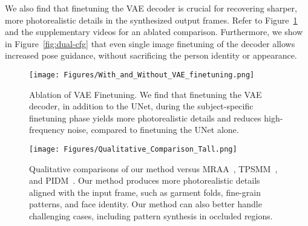         We also find that finetuning the VAE decoder is crucial for recovering sharper, more photorealistic details in the synthesized output frames. %
        Refer to Figure~\ref{fig:vae-finetuning} and the supplementary videos for an ablated comparison. Furthermore, we show in Figure~\ref{fig:dual-cfg} that even single image finetuning of the decoder allows increased pose guidance, without sacrificing the person identity or appearance.

        \begin{figure}[h!]
            \begin{center}
                \texttt{[image: Figures/With\_and\_Without\_VAE\_finetuning.png]}
            \end{center}
           \caption{Ablation of VAE Finetuning. We find that finetuning the VAE decoder, in addition to the UNet, during the subject-specific finetuning phase yields more photorealistic details and reduces high-frequency noise, compared to finetuning the UNet alone.}
        \label{fig:vae-finetuning}
        \end{figure}

        \begin{figure*}
            \begin{center}
                \texttt{[image: Figures/Qualitative\_Comparison\_Tall.png]}
            \end{center}
           \caption{Qualitative comparisons of our method versus MRAA~\cite{articulated_animation}, TPSMM~\cite{thin_plate_spline}, and PIDM~\cite{pose-transfer-dm}. Our method produces more photorealistic details aligned with the input frame, such as garment folds, fine-grain patterns, and face identity. Our method can also better handle challenging cases, including pattern synthesis in occluded regions.}
           \vspace{1em}
        \label{fig:qualitative}
        \end{figure*}
        
